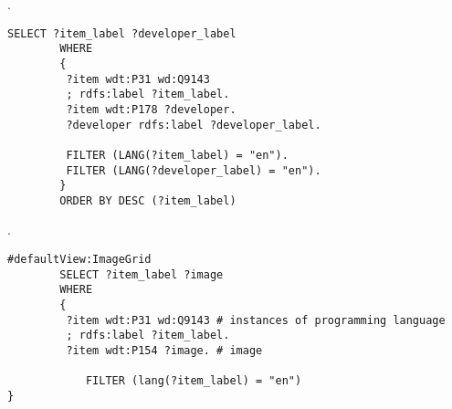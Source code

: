 
\begin{task}
    \label{answer:prog_lang_1}
    . 
	\begin{lstlisting}[language=SPARQL, caption={{Создатели языков программирования}\protect\footnotemark}, label=lst:prog_lang_answer_1]
		SELECT ?item_label ?developer_label
		WHERE
		{
		 ?item wdt:P31 wd:Q9143
		 ; rdfs:label ?item_label. 
		 ?item wdt:P178 ?developer.
		 ?developer rdfs:label ?developer_label.
		 
		 FILTER (LANG(?item_label) = "en"). 
		 FILTER (LANG(?developer_label) = "en"). 
		}
		ORDER BY DESC (?item_label)
	\end{lstlisting}
\end{task}

\begin{task}
    \label{answer:prog_lang_2}
    . 
	\begin{lstlisting}[language=SPARQL, caption={{Логотипы языков программирования}\protect\footnotemark}, label=lst:prog_lang_answer_1]
		#defaultView:ImageGrid
		SELECT ?item_label ?image
		WHERE
		{
		 ?item wdt:P31 wd:Q9143 # instances of programming language
		 ; rdfs:label ?item_label. 
		 ?item wdt:P154 ?image. # image
		 	
		 	FILTER (lang(?item_label) = "en")
}
	\end{lstlisting}

\end{task}

\begin{task}
    \label{answer:prog_lang_3}
    
\end{task}

